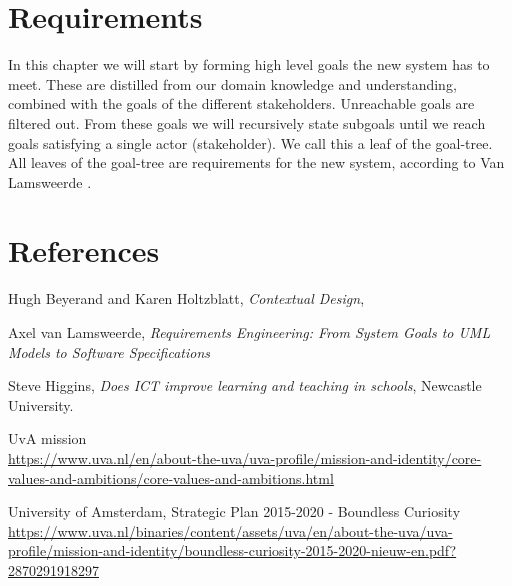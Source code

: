 \chapter{Requirements}
In this chapter we will start by forming high level goals the new system has to meet. These are distilled from our domain knowledge and understanding, combined with the goals of the different stakeholders. Unreachable goals are filtered out. From these goals we will recursively state subgoals until we reach goals satisfying a single actor (stakeholder). We call this a leaf of the goal-tree. All leaves of the goal-tree are requirements for the new system, according to Van Lamsweerde \cite{RE_book}.


\chapter{References}

\begin{thebibliography}{9}
	
	Hugh Beyerand and Karen Holtzblatt,
	\emph{Contextual Design},
	
	Axel van Lamsweerde,
	\emph{Requirements Engineering: From System Goals to UML Models to Software Specifications}
	
	Steve Higgins,
	\emph{Does ICT improve learning and teaching in schools},
	Newcastle University.
	
	UvA mission \\
	\url{https://www.uva.nl/en/about-the-uva/uva-profile/mission-and-identity/core-values-and-ambitions/core-values-and-ambitions.html}
	
	University of Amsterdam,
	Strategic Plan 2015-2020 - Boundless Curiosity \\
	\url{https://www.uva.nl/binaries/content/assets/uva/en/about-the-uva/uva-profile/mission-and-identity/boundless-curiosity-2015-2020-nieuw-en.pdf?2870291918297}
	
	

	
\end{thebibliography}


\appendix



